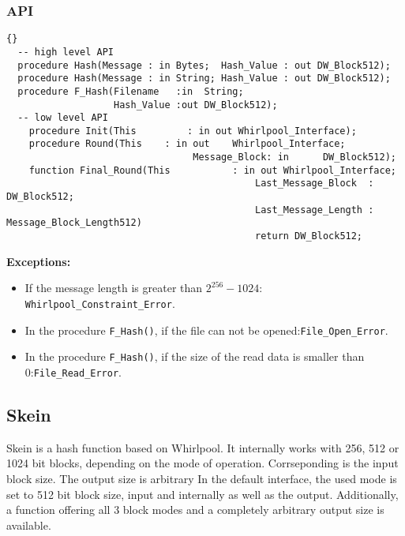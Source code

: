 \subsubsection*{API}
\begin{lstlisting}{}
  -- high level API
  procedure Hash(Message : in Bytes;  Hash_Value : out DW_Block512);
  procedure Hash(Message : in String; Hash_Value : out DW_Block512);
  procedure F_Hash(Filename   :in  String;
                   Hash_Value :out DW_Block512);
  -- low level API
	procedure Init(This 		: in out Whirlpool_Interface);
	procedure Round(This 	: in out 	Whirlpool_Interface;
								 Message_Block: in 		DW_Block512);
	function Final_Round(This 		    : in out Whirlpool_Interface;
											Last_Message_Block  : DW_Block512;
											Last_Message_Length : Message_Block_Length512)
											return DW_Block512;

\end{lstlisting}
\textbf{Exceptions:}
\begin{itemize}
\item If the message length is greater than $2^{256}-1024$:\quad
  \texttt{Whirlpool\_Constraint\_Error}.
\item In the procedure \texttt{F\_Hash()}, if the file can not be
  opened:\quad\texttt{File\_Open\_Error}.
\item In the procedure \texttt{F\_Hash()}, if the size of the read
  data is smaller than 0:\quad\texttt{File\_Read\_Error}.
\end{itemize}


\subsection{Skein}

Skein is a hash function based on Whirlpool. It internally works with
256, 512 or 1024 bit blocks, depending on the mode of operation. 
Corrseponding is the input block size. The output size is arbitrary
In the default interface, the used mode is set to 512 bit block size,
input and internally as well as the output.
Additionally, a function offering all 3 block modes and a completely
arbitrary output size is available.


